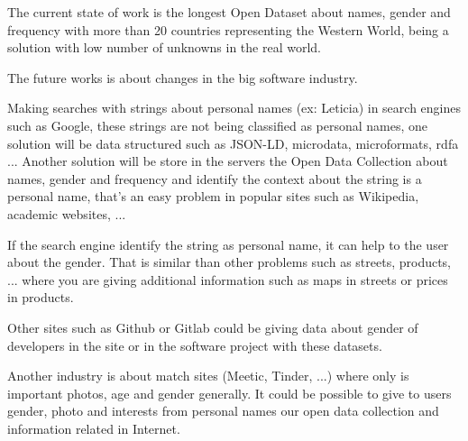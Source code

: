 \documentclass[a4paper]{article}
\begin{document}
The current state of work is the longest Open Dataset about names,
gender and frequency with more than 20 countries representing the
Western World, being a solution with low number of unknowns in the real
world.

The future works is about changes in the big software industry.

Making searches with strings about personal names (ex: Leticia) in
search engines such as Google, these strings are not being classified
as personal names, one solution will be data structured such as
JSON-LD, microdata, microformats, rdfa ... Another solution will be
store in the servers the Open Data Collection about names, gender and
frequency and identify the context about the string is a personal
name, that's an easy problem in popular sites such as Wikipedia,
academic websites, ...

If the search engine identify the string as personal name, it can help
to the user about the gender. That is similar than other problems such
as streets, products, ... where you are giving additional information
such as maps in streets or prices in products.

Other sites such as Github or Gitlab could be giving data about
gender of developers in the site or in the software project with these
datasets.

Another industry is about match sites (Meetic, Tinder, ...) where only
is important photos, age and gender generally. It could be possible to give
to users gender, photo and interests from personal names our open data
collection and information related in Internet.






\end{document}
